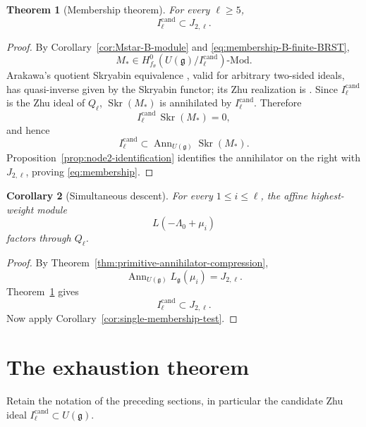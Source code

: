 \documentclass[11pt]{amsart}
\newtheorem{theorem}{Theorem}[section]
\newtheorem{corollary}[theorem]{Corollary}
\theoremstyle{remark}
\numberwithin{equation}{section}
\begin{document}
\begin{theorem}[Membership theorem]
\label{thm:membership}
For every \(\ell\ge5\),
\begin{equation}
\label{eq:membership}
   I_\ell^{\mathrm{cand}}
   \subset
   J_{2,\ell}.
\end{equation}
\end{theorem}

\begin{proof}
By Corollary~\ref{cor:Mstar-B-module} and
\eqref{eq:membership-B-finite-BRST},
\[
   M_*
   \in
   H^0_{f_\theta}
   \!\left(
      U(\mathfrak g)/I_\ell^{\mathrm{cand}}
   \right)\text{-Mod}.
\]
Arakawa's quotient Skryabin equivalence
\cite[Theorem~3.6]{Arakawa2015}, valid for arbitrary two-sided ideals, has
quasi-inverse given by the Skryabin functor; its Zhu realization is
\cite[Theorem~8.6]{Arakawa2015}.  Since \(I_\ell^{\mathrm{cand}}\) is the Zhu
ideal of \(Q_\ell\), \(\operatorname{Skr}(M_*)\) is annihilated by
\(I_\ell^{\mathrm{cand}}\).  Therefore
\[
   I_\ell^{\mathrm{cand}}\,
   \operatorname{Skr}(M_*)
   =
   0,
\]
and hence
\[
   I_\ell^{\mathrm{cand}}
   \subset
   \operatorname{Ann}_{U(\mathfrak g)}
   \operatorname{Skr}(M_*).
\]
Proposition~\ref{prop:node2-identification} identifies the annihilator on the
right with \(J_{2,\ell}\), proving
\eqref{eq:membership}.
\end{proof}

\begin{corollary}[Simultaneous descent]
For every \(1\le i\le\ell\), the affine highest-weight module
\[
   L(-\Lambda_0+\mu_i)
\]
factors through \(Q_\ell\).
\end{corollary}

\begin{proof}
By Theorem~\ref{thm:primitive-annihilator-compression},
\[
   \operatorname{Ann}_{U(\mathfrak g)}
   L_{\mathfrak g}(\mu_i)
   =
   J_{2,\ell}.
\]
Theorem~\ref{thm:membership} gives
\[
   I_\ell^{\mathrm{cand}}
   \subset
   J_{2,\ell}.
\]
Now apply Corollary~\ref{cor:single-membership-test}.
\end{proof}

\section{The exhaustion theorem}
\label{sec:exhaustion}

Retain the notation of the preceding sections, in particular the candidate
Zhu ideal \(I_\ell^{\mathrm{cand}}\subset U(\mathfrak g)\).
\end{document}
